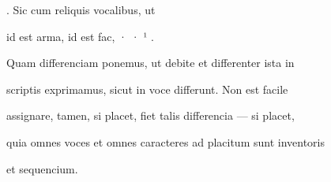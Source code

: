  . Sic cum reliquis vocalibus, ut  

 id est arma,  id est fac, · · ¹ .

Quam differenciam ponemus, ut debite et differenter ista in

scriptis exprimamus, sicut in voce differunt. Non est facile

assignare, tamen, si placet, fiet talis differencia — si placet,




\fullpreviouslines

{
\color{blue}
quia omnes voces et omnes caracteres ad placitum sunt inventoris

et sequencium.

}


\endinput






Non est facile

assignare, tamen, si placet, fiet talis differencia — si placet,

60:
eo \y rkp.: quantocius.


\catcode `\^^M=5

  \newtip{48}{Łoś niesłusznie uważa, że \textit{bika} w obu wypadkach
    napisano błędnie zamiast \textit{ƀyka}. Przykłady są bowiem podane
    w~pisowni dotychczasowej dla pokazania jej niewystarczalności do
    zróżnicowania wyrazów \textit{bika} i \textit{byka}.}

\obeylines




\newcommand{\margin}[1]{\annotatetextBlue{\{#1\}}{zapisy na marginesie}}



\renewcommand{\over}[1]{\annotatetextBlue{\{#1\}}{zapisy nad rządkami}}

\newcommand{\add}[1]{\annotatetextOlive{<#1>}{litery i wyrazy dodane, (których w tekście brak)}}

\newcommand{\extra}[1]{\colorbox{magenta!10}{[#1]}}

\newcommand{\overstr}[1]{\annotatetextMagenta{⟦#1⟧}{przekreślenia}}



